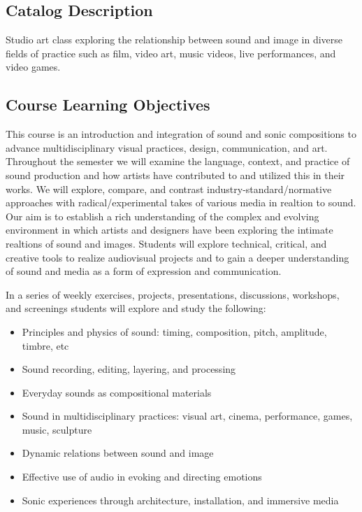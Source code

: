 \subsection{Catalog Description}

Studio art class exploring the relationship between sound and image in diverse fields of practice such as film, video art, music videos, live performances, and video games.

\subsection{Course Learning Objectives}

This course is an introduction and integration of sound and sonic compositions to advance multidisciplinary visual practices, design, communication, and art. Throughout the semester we will examine the language, context, and practice of sound production and how artists have contributed to and utilized this in their works. We will explore, compare, and contrast industry-standard/normative approaches with radical/experimental takes of various media in realtion to sound. Our aim is to establish a rich understanding of the complex and evolving environment in which artists and designers have been exploring the intimate realtions of sound and images. Students will explore technical, critical, and creative tools to realize audiovisual projects and to gain a deeper understanding of sound and media as a form of expression and communication.

In a series of weekly exercises, projects, presentations, discussions, workshops, and screenings students will explore and study the following:

\begin{itemize}
      \tightlist
      \item Principles and physics of sound: timing, composition, pitch, amplitude, timbre, etc
      \item Sound recording, editing, layering, and processing 
      \item Everyday sounds as compositional materials 
      \item Sound in multidisciplinary practices: visual art, cinema, performance, games, music, sculpture
      \item Dynamic relations between sound and image
      \item Effective use of audio in evoking and directing emotions 
      \item Sonic experiences through architecture, installation, and immersive media
\end{itemize}

